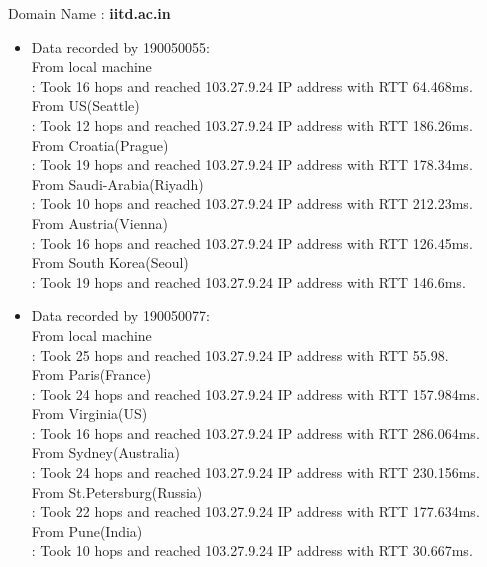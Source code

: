 \documentclass[12pt]{article}
\theoremstyle{remark}
\newcommand{\tbf}[1]{\textbf{#1}}
\begin{document}
Domain Name : \tbf{iitd.ac.in} \\
\begin{itemize}
    \item Data recorded by 190050055:\\
From local machine  \\
: Took 16 hops and reached 103.27.9.24 IP address with RTT 64.468ms.\\
From US(Seattle)    \\
: Took 12 hops and reached 103.27.9.24 IP address with RTT 186.26ms. \\
From Croatia(Prague) \\
: Took 19 hops and reached 103.27.9.24 IP address with RTT 178.34ms.  \\
From Saudi-Arabia(Riyadh)\\
: Took 10 hops and reached 103.27.9.24 IP address with RTT 212.23ms. \\
From Austria(Vienna)    \\
: Took 16 hops and reached 103.27.9.24 IP address with RTT 126.45ms. \\
From South Korea(Seoul)   \\
: Took 19 hops and reached 103.27.9.24 IP address with RTT 146.6ms.\\  

\item Data recorded by 190050077:\\
From local machine    \\
: Took 25 hops and reached 103.27.9.24 IP address with RTT 55.98.\\
From Paris(France)  \\
: Took 24 hops and reached 103.27.9.24 IP address with RTT 157.984ms.\\
From Virginia(US)   \\
: Took 16 hops and reached 103.27.9.24 IP address with RTT 286.064ms.\\
From Sydney(Australia)\\
: Took 24 hops and reached 103.27.9.24  IP address with RTT 230.156ms.\\
From St.Petersburg(Russia) \\
: Took 22 hops and reached 103.27.9.24   IP address with RTT 177.634ms.\\
From Pune(India)      \\
: Took 10 hops and reached 103.27.9.24  IP address with RTT 30.667ms.\\


\end{itemize}
\end{document}
